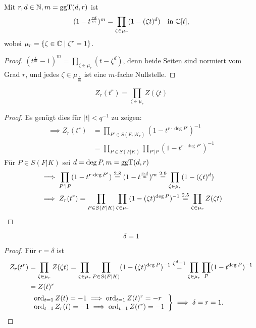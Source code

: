 \begin{lemma}
    Mit $r,d \in \mathbb{N}, m = \operatorname{ggT}(d,r)$ ist 
    $$ (1-t^{\frac{rd}{m}})^m = \prod_{\zeta \in \mu_r}(1-(\zeta t)^d) \quad \text{in } \mathbb{C}[t],$$
    wobei $\mu_r = \{\zeta \in \mathbb{C} \mid \zeta^r = 1\}$.
\end{lemma}
\begin{proof}
    $(t^{\frac{r}{m}}-1)^m = \prod\limits_{\zeta\in\mu_r}(t-\zeta^d)$, denn beide Seiten sind normiert vom Grad $r$, und jedes $\zeta \in \mu_{\frac{r}{m}}$ ist eine $m$-fache Nullstelle.
\end{proof}

\begin{satz}
    $$ Z_r(t^r) = \prod_{\zeta \in \mu_r} Z(\zeta t) $$
\end{satz}
\begin{proof}
    Es genügt dies für $|t| < q^{-1}$ zu zeigen:
    \begin{align*}
        \implies Z_r(t^r) &= \prod_{P' \in S(F_r|K_r)} (1 - t^{r\cdot \deg P'})^{-1}\\
            &= \prod_{P \in S(F|K)}\prod_{P'|P} (1 - t^{r\cdot \deg P'})^{-1}
    \end{align*}
    Für $P \in S(F|K)$ sei $d = \deg P, m=\operatorname{ggT}(d,r)$
    \begin{align*}
        & \implies \prod_{P'|P} (1 - t^{r\cdot \deg P'}) \stackrel{2.8}{=} (1 - t^{\frac{r\cdot d}{m}})^m \stackrel{2.9}{=} \prod_{\zeta \in \mu_r}(1-(\zeta t)^d)\\
        & \implies Z_r(t^r) = \prod_{P \in S(F|K)}\prod_{\zeta \in \mu_r}(1-(\zeta t)^{\deg P})^{-1} \stackrel{2.5}{=} \prod_{\zeta \in \mu_r} Z(\zeta t)
    \end{align*}
\end{proof}

\begin{theorem}[F.K. Schmidt]
    $$ \delta = 1 $$
\end{theorem}
\begin{proof}
    Für $r = \delta$ ist
    \begin{align*}
        Z_r(t^r) &= \prod_{\zeta \in \mu_r} Z(\zeta t) = \prod_{\zeta \in \mu_r} \prod_{P \in S(F|K)} (1-(\zeta t)^{\deg P})^{-1}
            \stackrel{\zeta^d=1}{=} \prod_{\zeta \in \mu_r}\prod_P (1-t^{\deg P})^{-1} \\
            &= Z(t)^r\\
        &\left.\begin{array}{l}
            \operatorname{ord}_{t=1}Z(t) = -1 \implies \operatorname{ord}_{t=1}Z(t)^r = -r \\
            \operatorname{ord}_{t=1}Z_r(t) = -1 \implies \operatorname{ord}_{t=1} Z(t^r) = -1
        \end{array}\right\} \implies \delta = r = 1.
    \end{align*}
\end{proof}


